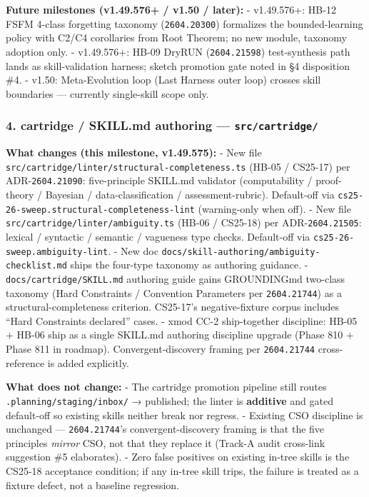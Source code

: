 \documentclass[11pt,letterpaper]{article}
\newcommand{\arxivid}[1]{\texttt{\textcolor{accent}{#1}}}
\begin{document}
\textbf{Future milestones (v1.49.576+ / v1.50 / later):} - v1.49.576+:
HB-12 FSFM 4-class forgetting taxonomy (\arxivid{2604.20300}) formalizes
the bounded-learning policy with C2/C4 corollaries from Root Theorem; no
new module, taxonomy adoption only. - v1.49.576+: HB-09 DryRUN
(\arxivid{2604.21598}) test-synthesis path lands as skill-validation
harness; sketch promotion gate noted in §4 disposition \#4. - v1.50:
Meta-Evolution loop (Last Harness outer loop) crosses skill boundaries
--- currently single-skill scope only.

\subsubsection{\texorpdfstring{4. cartridge / SKILL.md authoring ---
\texttt{src/cartridge/}}{4. cartridge / SKILL.md authoring --- src/cartridge/}}

\textbf{What changes (this milestone, v1.49.575):} - New file
\texttt{src/cartridge/linter/structural-completeness.ts} (HB-05 /
CS25-17) per ADR-\arxivid{2604.21090}: five-principle SKILL.md validator
(computability / proof-theory / Bayesian / data-classification /
assessment-rubric). Default-off via
\texttt{cs25-26-sweep.structural-completeness-lint} (warning-only when
off). - New file \texttt{src/cartridge/linter/ambiguity.ts} (HB-06 /
CS25-18) per ADR-\arxivid{2604.21505}: lexical / syntactic / semantic / vagueness
type checks. Default-off via \texttt{cs25-26-sweep.ambiguity-lint}. -
New doc \texttt{docs/skill-authoring/ambiguity-checklist.md} ships the
four-type taxonomy as authoring guidance. -
\texttt{docs/cartridge/SKILL.md} authoring guide gains GROUNDINGmd
two-class taxonomy (Hard Constraints / Convention Parameters per
\arxivid{2604.21744}) as a structural-completeness criterion. CS25-17's
negative-fixture corpus includes ``Hard Constraints declared'' cases. -
xmod CC-2 ship-together discipline: HB-05 + HB-06 ship as a single
SKILL.md authoring discipline upgrade (Phase 810 + Phase 811 in
roadmap). Convergent-discovery framing per \arxivid{2604.21744}
cross-reference is added explicitly.

\textbf{What does not change:} - The cartridge promotion pipeline still
routes \texttt{.planning/staging/inbox/} → published; the linter is
\textbf{additive} and gated default-off so existing skills neither break
nor regress. - Existing CSO discipline is unchanged ---
\arxivid{2604.21744}'s convergent-discovery framing is that the five
principles \emph{mirror} CSO, not that they replace it (Track-A audit
cross-link suggestion \#5 elaborates). - Zero false positives on
existing in-tree skills is the CS25-18 acceptance condition; if any
in-tree skill trips, the failure is treated as a fixture defect, not a
baseline regression.
\end{document}
